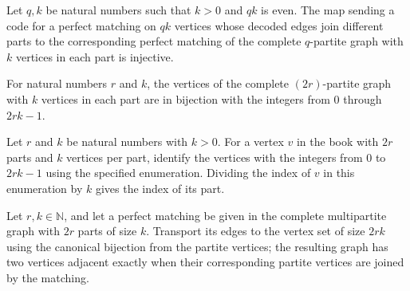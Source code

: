 \begin{theorem}
\label{FABL.partiteMatchingGraphOfCode_injective}
\leanok
{}
Let $q,k$ be natural numbers such that $k>0$ and $qk$ is even. The map sending a code
for a perfect matching on $qk$ vertices whose decoded edges join different parts to the
corresponding perfect matching of the complete $q$-partite graph with $k$ vertices in
each part is injective.
\end{theorem}

\begin{definition}
\label{FABL.bookVertexEvenFinEquiv}
\leanok
{}
For natural numbers $r$ and $k$, the vertices of the complete $(2r)$-partite graph with
$k$ vertices in each part are in bijection with the integers from $0$ through $2rk-1$.
\end{definition}

\begin{theorem}
\label{FABL.bookVertexEvenFinEquiv_val_div}
\leanok
{}
Let $r$ and $k$ be natural numbers with $k>0$. For a vertex $v$ in the book with $2r$
parts and $k$ vertices per part, identify the vertices with the integers from $0$ to
$2rk-1$ using the specified enumeration. Dividing the index of $v$ in this enumeration
by $k$ gives the index of its part.
\end{theorem}

\begin{definition}
\label{FABL.relabelBookMatchingGraph}
\leanok
{}
Let $r,k\in\mathbb{N}$, and let a perfect matching be given in the complete multipartite
graph with $2r$ parts of size $k$. Transport its edges to the vertex set of size $2rk$
using the canonical bijection from the partite vertices; the resulting graph has two
vertices adjacent exactly when their corresponding partite vertices are joined by the
matching.
\end{definition}

